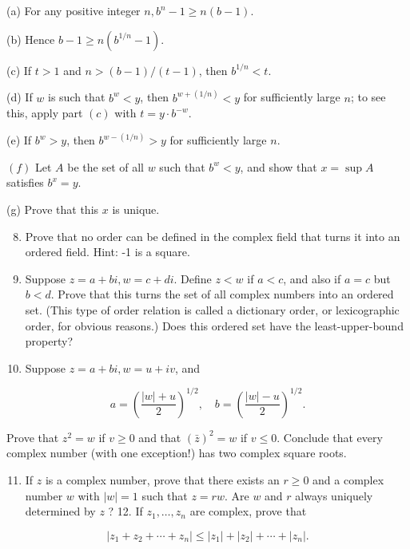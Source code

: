 \documentclass[10pt]{article}
\begin{document}
(a) For any positive integer $n, b^{n}-1 \geq n(b-1)$.

(b) Hence $b-1 \geq n\left(b^{1 / n}-1\right)$.

(c) If $t>1$ and $n>(b-1) /(t-1)$, then $b^{1 / n}<t$.

(d) If $w$ is such that $b^{w}<y$, then $b^{w+(1 / n)}<y$ for sufficiently large $n$; to see this, apply part $(c)$ with $t=y \cdot b^{-w}$.

(e) If $b^{w}>y$, then $b^{w-(1 / n)}>y$ for sufficiently large $n$.

$(f)$ Let $A$ be the set of all $w$ such that $b^{w}<y$, and show that $x=\sup A$ satisfies $b^{x}=y$.

(g) Prove that this $x$ is unique.

\begin{enumerate}
  \setcounter{enumi}{7}
  \item Prove that no order can be defined in the complex field that turns it into an ordered field. Hint: -1 is a square.

  \item Suppose $z=a+b i, w=c+d i$. Define $z<w$ if $a<c$, and also if $a=c$ but $b<d$. Prove that this turns the set of all complex numbers into an ordered set. (This type of order relation is called a dictionary order, or lexicographic order, for obvious reasons.) Does this ordered set have the least-upper-bound property?

  \item Suppose $z=a+b i, w=u+i v$, and

\end{enumerate}

$$
a=\left(\frac{|w|+u}{2}\right)^{1 / 2}, \quad b=\left(\frac{|w|-u}{2}\right)^{1 / 2} .
$$

Prove that $z^{2}=w$ if $v \geq 0$ and that $(\bar{z})^{2}=w$ if $v \leq 0$. Conclude that every complex number (with one exception!) has two complex square roots.

\begin{enumerate}
  \setcounter{enumi}{10}
  \item If $z$ is a complex number, prove that there exists an $r \geq 0$ and a complex number $w$ with $|w|=1$ such that $z=r w$. Are $w$ and $r$ always uniquely determined by $z$ ? 12. If $z_{1}, \ldots, z_{n}$ are complex, prove that
\end{enumerate}

$$
\left|z_{1}+z_{2}+\cdots+z_{n}\right| \leq\left|z_{1}\right|+\left|z_{2}\right|+\cdots+\left|z_{n}\right| .
$$
\end{document}
